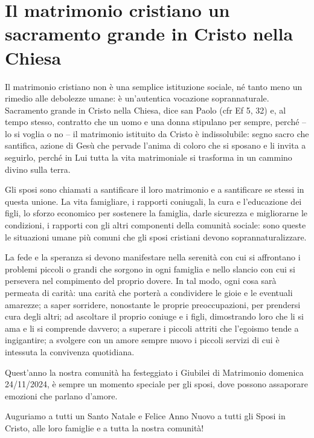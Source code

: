 \section{Il matrimonio cristiano un sacramento grande in Cristo nella Chiesa}

Il matrimonio cristiano non è una semplice istituzione sociale, né tanto meno un rimedio alle debolezze umane: è un'autentica vocazione soprannaturale. Sacramento grande in Cristo nella Chiesa, dice san Paolo (cfr Ef 5, 32) e, al tempo stesso, contratto che un uomo e una donna stipulano per sempre, perché -- lo si voglia o no -- il matrimonio istituito da Cristo è indissolubile: segno sacro che santifica, azione di Gesù che pervade l'anima di coloro che si sposano e li invita a seguirlo, perché in Lui tutta la vita matrimoniale si trasforma in un cammino divino sulla terra.

Gli sposi sono chiamati a santificare il loro matrimonio e a santificare se stessi in questa unione. La vita famigliare, i rapporti coniugali, la cura e l'educazione dei figli, lo sforzo economico per sostenere la famiglia, darle sicurezza e migliorarne le condizioni, i rapporti con gli altri componenti della comunità sociale: sono queste le situazioni umane più comuni che gli sposi cristiani devono soprannaturalizzare.

La fede e la speranza si devono manifestare nella serenità con cui si affrontano i problemi piccoli o grandi che sorgono in ogni famiglia e nello slancio con cui si persevera nel compimento del proprio dovere. In tal modo, ogni cosa sarà permeata di carità: una carità che porterà a condividere le gioie e le eventuali amarezze; a saper sorridere, nonostante le proprie preoccupazioni, per prendersi cura degli altri; ad ascoltare il proprio coniuge e i figli, dimostrando loro che li si ama e li si comprende davvero; a superare i piccoli attriti che l'egoismo tende a ingigantire; a svolgere con un amore sempre nuovo i piccoli servizi di cui è intessuta la convivenza quotidiana.

Quest'anno la nostra comunità ha festeggiato i Giubilei di Matrimonio domenica 24/11/2024, è sempre un momento speciale per gli sposi, dove possono assaporare emozioni che parlano d'amore.

Auguriamo a tutti un Santo Natale e Felice Anno Nuovo a tutti gli Sposi in Cristo, alle loro famiglie e a tutta la nostra comunità!


\clearpage

